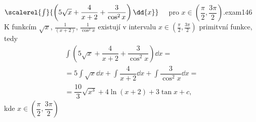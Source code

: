 \begin{mathexam}{\(\protect\scalerel{\int}{\left(5\sqrt{x} + \dfrac{4}{x+2} +
  \dfrac{3}{\cos^2x}\right)\dd{x}} \quad\) pro \(x\in\left(\dfrac{\pi}{2},
  \dfrac{3\pi}{2}\right)\).}{exam146} 
%   
  K funkcím \(\sqrt{x}\), \(\frac{1}{(x+2)}\), \(\frac{1}{\cos^2x}\) existují v intervalu
  \(x\in(\frac{\pi}{2}, \frac{3\pi}{2})\) primitvní funkce, tedy  
  \begin{multline*}
    \int\left(5\sqrt{x} + \dfrac{4}{x+2} + \dfrac{3}{\cos^2x}\right)\dd{x} =       \\
        = 5\int\sqrt{x}\dd{x} + \int\dfrac{4}{x+2}\dd{x} + \int\dfrac{3}{\cos^2x}\dd{x} = \\
        = \dfrac{10}{3}\sqrt{x^3} + 4\ln(x+2) + 3\tan x + c, 
  \end{multline*}
  kde \(x\in\left(\dfrac{\pi}{2}, \dfrac{3\pi}{2}\right)\)
\end{mathexam}